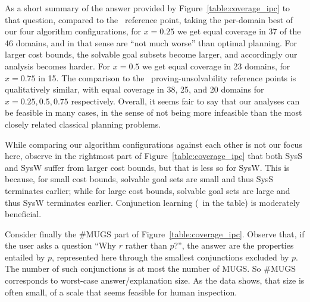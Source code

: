 As a short summary of the answer provided by
Figure~\ref{table:coverage_ipc} to that question, compared to
the \hlmcut\ reference point, taking the per-domain best of our four
algorithm configurations, for $x=0.25$ we get equal coverage in 37 of
the 46 domains, and in that sense are ``not much worse'' than optimal
planning. For larger cost bounds, the solvable goal subsets become
larger, and accordingly our analysis becomes harder. For $x=0.5$ we
get equal coverage in 23 domains, for $x=0.75$ in 15. The comparison
to the \hc\ proving-unsolvability reference points is qualitatively
similar, with equal coverage in 38, 25, and 20 domains for $x=0.25,
0.5, 0.75$ respectively. Overall, it seems fair to say that our
analyses can be feasible in many cases, in the sense of not being more
infeasible than the most closely related classical planning problems.

While comparing our algorithm configurations against each other is not
our focus here, observe in the rightmost part of
Figure~\ref{table:coverage_ipc} that both SysS and SysW suffer from
larger cost bounds, but that is less so for SysW. This is because, for
small cost bounds, solvable goal sets are small and thus SysS
terminates earlier; while for large cost bounds, solvable goal sets
are large and thus SysW terminates earlier. Conjunction learning (\hc\
in the table) is moderately beneficial.
%
%

Consider finally the \#MUGS part of
Figure~\ref{table:coverage_ipc}. Observe that, if the user asks a
question ``Why $r$ rather than $p$?'', the answer are the properties
entailed by $p$, represented here through the smallest conjunctions
excluded by $p$. The number of such conjunctions is at most the number
of MUGS. So \#MUGS corresponds to worst-case answer/explanation
size. As the data shows, that size is often small, of a scale that
seems feasible for human inspection. 
%

